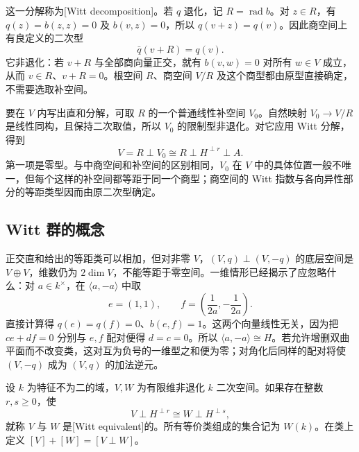 这一分解称为[Witt decomposition]。若 \(q\) 退化，记 \(R=\operatorname{rad}b\)。对 \(z\in R\)，有 \(q(z)=b(z,z)=0\) 及 \(b(v,z)=0\)，所以 \(q(v+z)=q(v)\)。因此商空间上有良定义的二次型
\[
	\bar q(v+R)=q(v).
\]
它非退化：若 \(v+R\) 与全部商向量正交，就有 \(b(v,w)=0\) 对所有 \(w\in V\) 成立，从而 \(v\in R\)、\(v+R=0\)。根空间 \(R\)、商空间 \(V/R\) 及这个商型都由原型直接确定，不需要选取补空间。

\ProseParagraphBreak
要在 \(V\) 内写出直和分解，可取 \(R\) 的一个普通线性补空间 \(V_0\)。自然映射 \(V_0\to V/R\) 是线性同构，且保持二次取值，所以 \(V_0\) 的限制型非退化。对它应用 Witt 分解，得到
\[
	V=R\perp V_0 \cong R\perp H^{\perp r}\perp A.
\]
第一项是零型。与中商空间和补空间的区别相同，\(V_0\) 在 \(V\) 中的具体位置一般不唯一，但每个这样的补空间都等距于同一个商型；商空间的 Witt 指数与各向异性部分的等距类型因而由原二次型确定。

\subsection{Witt 群的概念}
\label{b2:subsec:1003:03}

正交直和给出的等距类可以相加，但对非零 \(V\)，\((V,q)\perp(V,-q)\) 的底层空间是 \(V\oplus V\)，维数仍为 \(2\dim V\)，不能等距于零空间。一维情形已经揭示了应忽略什么：对 \(a\in k^\times\)，在 \(\langle a,-a\rangle\) 中取
\[
	e=(1,1),\qquad f=\left(\frac1{2a},-\frac1{2a}\right).
\]
直接计算得 \(q(e)=q(f)=0\)、\(b(e,f)=1\)。这两个向量线性无关，因为把 \(ce+df=0\) 分别与 \(e,f\) 配对便得 \(d=c=0\)。所以 \(\langle a,-a\rangle\cong H\)。若允许增删双曲平面而不改变类，这对互为负号的一维型之和便为零；对角化后同样的配对将使 \((V,-q)\) 成为 \((V,q)\) 的加法逆元。

\begin{definition}\label{b2:def:witt-equivalence}
	设 \(k\) 为特征不为二的域，\(V,W\) 为有限维非退化 \(k\) 二次空间。如果存在整数 \(r,s\ge0\)，使
	\[
		V\perp H^{\perp r}\cong W\perp H^{\perp s},
	\]
	就称 \(V\) 与 \(W\) 是[Witt equivalent]的。所有等价类组成的集合记为 \(W(k)\)。在类上定义 \([V]+[W]=[V\perp W]\)。
\end{definition}

